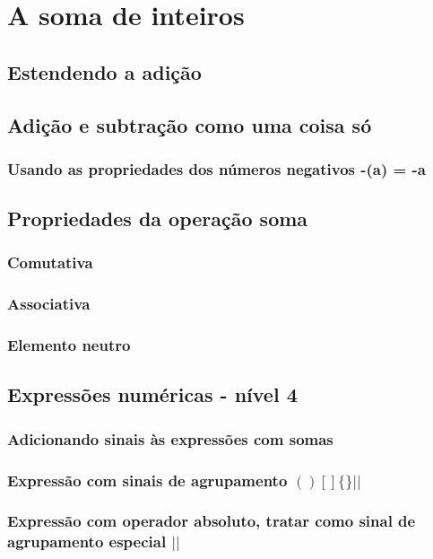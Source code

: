 \chapter[A soma de inteiros]{A soma de inteiros}

\section{Estendendo a adição}

\section{Adição e subtração como uma coisa só}

\subsection{Usando as propriedades dos números negativos -(a) = -a}

\section{Propriedades da operação soma}

\subsection{Comutativa}

\subsection{Associativa}

\subsection{Elemento neutro}

\section{Expressões numéricas - nível 4}

\subsection{Adicionando sinais às expressões com somas}

\subsection{Expressão com sinais de agrupamento $ ( ) [ ] \{ \} | | $}

\subsection{Expressão com operador absoluto, tratar como sinal de agrupamento especial $ | | $}
